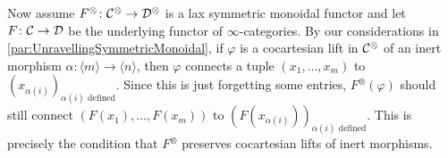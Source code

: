 \begin{numpar}\label{par:UnravellingLaxSymmetricMonoidal}
	Now assume $F^\otimes\colon \mathcal{C}^\otimes\rightarrow \mathcal{D}^\otimes$ is a lax symmetric monoidal functor and let $F\colon \mathcal{C}\rightarrow \mathcal{D}$ be the underlying functor of $\infty$-categories. By our considerations in \cref{par:UnravellingSymmetricMonoidal}, if $\varphi$ is a cocartesian lift in $\mathcal{C}^\otimes$ of an inert morphism $\alpha\colon \langle m\rangle\rightarrow \langle n\rangle$, then $\varphi$ connects a tuple $(x_1,\dotsc,x_m)$ to $(x_{\alpha(i)})_{\alpha(i)\text{ defined}}$. Since this is just forgetting some entries, $F^\otimes(\varphi)$ should still connect $(F(x_1),\dotsc,F(x_m))$ to $(F(x_{\alpha(i)}))_{\alpha(i)\text{ defined}}$. This is precisely the condition that $F^\otimes$ preserves cocartesian lifts of inert morphisms.
	

\end{numpar}
